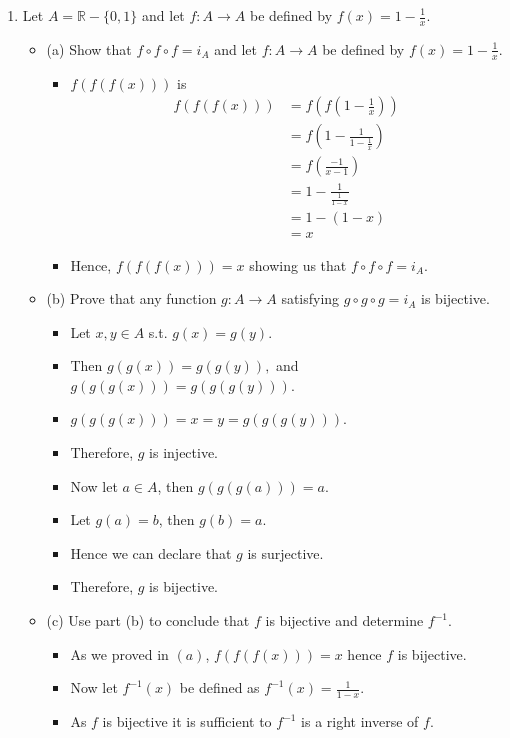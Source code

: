 \documentclass[letterpaper,12pt]{article}
\begin{document}
\begin{enumerate}
\begin{itemize}
\end{itemize}
\item Let $A = \mathbb{R} -\{0,1\}$ and let $f: A \rightarrow A $ be defined by $f(x) = 1-\frac{1}{x}$.
\begin{itemize}	

	\item (a) Show that $f \circ f \circ f = i_A$ and let $f : A \rightarrow A $ be defined by $f(x) = 1 - \frac{1}{x}.$
	\begin{itemize}
	\item $f(f(f(x)))$ is 
	\begin{align}
		f(f(f(x))) &= f(f(1-\frac{1}{x})) \\ &=f(1-\frac{
		1}{1-\frac{1}{x}}) \\&=f(\frac{-1}{x-1}) \\ &=1-\frac{1}{\frac{1}{1-x}} \\&=1-(1-x) \\ &= x
	\end{align}
	\item Hence, $f(f(f(x))) = x$ showing us that $f\circ f \circ f = i_A$.
	\end{itemize}
	\item (b) Prove that any function $g : A \rightarrow A $ satisfying $g\circ g \circ g = i_A$ is bijective.
	\begin{itemize}
	\item Let $x,y \in A$ s.t. $g(x) =g(y)$.
	\item Then $g(g(x)) = g(g(y)),$ and $g(g(g(x))) =g(g(g(y)))$.
	\item $g(g(g(x))) =x = y= g(g(g(y)))$. 
	\item Therefore, $g$ is injective.
	\item Now let $a \in A$, then $g(g(g(a)))= a$.
	\item Let $g(a) = b$, then $g(b) = a$.
	\item Hence we can declare that $g$ is surjective.
	\item Therefore, $g$ is bijective.
	\end{itemize}
	\item (c) Use part (b) to conclude that $f$ is bijective and determine $f^{-1}$.
	\begin{itemize}
	\item As we proved in $(a)$, $f(f(f(x))) =x$ hence $f$ is bijective.
	\item Now let $f^{-1}(x)$ be defined as $f^{-1}(x) = \frac{1}{1-x}$.
	\item As $f$ is bijective it is sufficient to $f^{-1}$ is a right inverse of $f$.

\end{itemize}
\end{itemize}
\end{enumerate}
\end{document}
